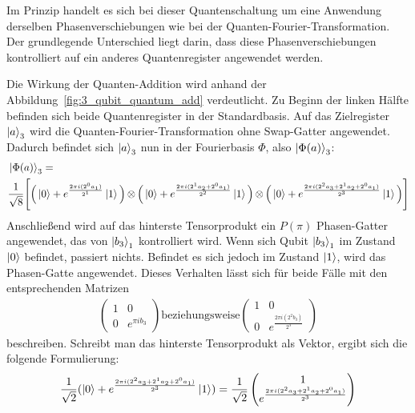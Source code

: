 Im Prinzip handelt es sich bei dieser Quantenschaltung um eine Anwendung derselben Phasenverschiebungen 
wie bei der Quanten-Fourier-Transformation. 
Der grundlegende Unterschied liegt darin, 
dass diese Phasenverschiebungen kontrolliert auf ein anderes Quantenregister angewendet werden.

Die Wirkung der Quanten-Addition wird anhand der Abbildung~\ref{fig:3_qubit_quantum_add} verdeutlicht.
Zu Beginn der linken Hälfte befinden sich beide Quantenregister in der Standardbasis.
Auf das Zielregister \(\ket{a}_3\) wird die Quanten-Fourier-Transformation ohne Swap-Gatter angewendet.
Dadurch befindet sich \(\ket{a}_3\) nun in der Fourierbasis \(\Phi\), also \(\ket{\Phi(a)}_3\):
\begin{align*}
  \begin{aligned}
  &\ket{\Phi(a)}_3 =\\
  &\frac{1}{\sqrt{8}} \Bigg[ \Big(\ket{0} + { e^{\frac{2 \pi i (2^0a_1)}{2^1}}}\ket{1} \Big) \operatorname{\otimes}
  \Big(\ket{0} + { e^{\frac{2 \pi i (2^1a_2+2^0a_1)}{2^2}}}\ket{1} \Big) \operatorname{\otimes}
  \Big(\ket{0} + { e^{\frac{2 \pi i (2^{2}a_3 +2^1a_2+2^0a_1)}{2^3}}}\ket{1} \Big) \Bigg]
  \end{aligned}
\end{align*}
Anschließend wird auf das hinterste Tensorprodukt ein \(P(\pi)\) Phasen-Gatter angewendet,
das von \(\ket{b_3}_1\) kontrolliert wird.
Wenn sich Qubit \(\ket{b_3}_1\) im Zustand \(\ket{0}\) befindet, passiert nichts.
Befindet es sich jedoch im Zustand \(\ket{1}\), wird das Phasen-Gatte angewendet.
Dieses Verhalten lässt sich für beide Fälle mit den entsprechenden Matrizen
\begin{align*}
  \begin{pmatrix}
    1 & 0 \\
    0 & e^{\pi i b_3}
  \end{pmatrix}  
  \text{beziehungsweise}  
  \begin{pmatrix}
    1 & 0 \\
    0 & e^{\frac{2\pi i (2^2b_3)}{2^3}}
  \end{pmatrix}
\end{align*}
beschreiben.
Schreibt man das hinterste Tensorprodukt als Vektor, ergibt sich die folgende Formulierung:
\[\frac{1}{\sqrt{2}}( \ket{0} + { e^{\frac{2 \pi i (2^{2}a_3 +2^1a_2+2^0a_1)}{2^3}}}\ket{1}) =
\frac{1}{\sqrt{2}}
\begin{pmatrix}
     1  \\
     e^{\frac{2 \pi i (2^{2}a_3 +2^1a_2+2^0a_1)}{2^3}}
  \end{pmatrix}
    \]
